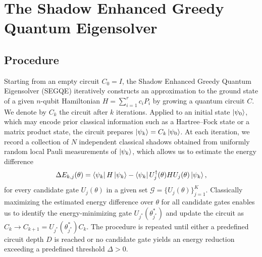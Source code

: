 \section{The Shadow Enhanced Greedy Quantum Eigensolver}
\label{sec:main}
\subsection{Procedure}
\label{sec:procedure}
Starting from an empty circuit $C_0=I$, the Shadow Enhanced Greedy Quantum Eigensolver (SEGQE) iteratively constructs an approximation to the ground state of a given $n$-qubit Hamiltonian $H=\sum^r_{i=1}c_iP_i$ by growing a quantum circuit $C$. We denote by $C_k$ the circuit after $k$ iterations. Applied to an initial state $\ket{\psi_0}$, which may encode prior classical information such as a Hartree--Fock state or a matrix product state, the circuit prepares $\ket{\psi_k}=C_k\ket{\psi_0}$. At each iteration, we record a collection of $N$ independent classical shadows obtained from uniformly random local Pauli measurements of $\ket{\psi_k}$, which allows us to estimate the energy difference
\begin{equation}
   \Delta E_{k, j}(\theta) =\bra{\psi_k}H\ket{\psi_k}-\bra{\psi_k}U^\dagger _j(\theta)HU_j(\theta)\ket{\psi_k},
\end{equation}
for every candidate gate $U_j(\theta)$ in a given set $\mathcal{G}=\{U_j(\theta)\}^K_{j=1}$. Classically maximizing the estimated energy difference over $\theta$ for all candidate gates enables us to identify the energy-minimizing gate $U_{j^*}(\theta^*_{j^*})$ and update the circuit as $C_k\to C_{k+1}=U_{j^*}(\theta^*_{j^*})C_k$. The procedure is repeated until either a predefined circuit depth $D$ is reached or no candidate gate yields an energy reduction exceeding a predefined threshold $\Delta >0$. 

